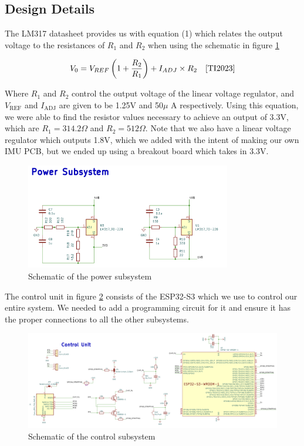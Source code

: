 \subsection{Design Details}
The LM317 datasheet \cite{TI2023} provides us with equation (1) which relates the output voltage to the resistances of $R_1$ and $R_2$ when using the schematic in figure \ref{fig:power_sub}

\begin{equation}
V_0 = V_{REF} \left(1 + \frac{R_2}{R_1}\right) + I_{ADJ} \times R_2 \quad \cite{TI2023}
\end{equation}

Where $R_1$ and $R_2$ control the output voltage of the linear voltage regulator, and $V_{\text{REF}}$ and $I_{\text{ADJ}}$ are given to be 1.25V and 50$\mu$ A respectively. Using this equation, we were able to find the resistor values necessary to achieve an output of 3.3V, which are $R_1 = 314.2 \Omega$ and $R_2 = 512 \Omega$. Note that we also have a linear voltage regulator which outputs 1.8V, which we added with the intent of making our own IMU PCB, but we ended up using a breakout board which takes in 3.3V.

\begin{figure}[ht]
    \centering
    \includegraphics[width=0.8\textwidth]{images/power_sub.png}
    \caption{Schematic of the power subsystem}
    \label{fig:power_sub}
\end{figure}
\newpage
The control unit in figure \ref{fig:control_sub} consists of the ESP32-S3 which we use to control our entire system. We needed to add a programming circuit for it and ensure it has the proper connections to all the other subsystems.

\begin{figure}[ht]
    \centering
    \includegraphics[width=1.0\textwidth]{images/control_sub.png}
    \caption{Schematic of the control subsystem}
    \label{fig:control_sub}
\end{figure}

